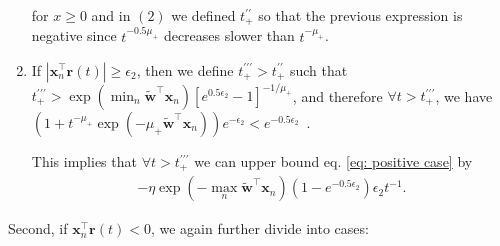 \documentclass[twoside,11pt,english]{article}
\begin{document}
\begin{enumerate}
for $x\geq0$ and in $\left(2\right)$ we defined $t_{+}^{\prime\prime}$
so that the previous expression is negative \textemdash{} since $t^{-0.5\mu_{+}}$ decreases slower than $t^{-\mu_{+}}$. 
\item If $\left|\mathbf{x}_{n}^{\top}\mathbf{r}(t)\right|\geq\epsilon_{2}$,
then we define $t_{+}^{\prime\prime\prime}>t_{+}^{\prime\prime}$
such that $t_{+}^{\prime\prime\prime}>\exp\left(\min_{n}\tilde{\mathbf{w}}^{\top}\mathbf{x}_{n}\right)\left[e^{0.5\epsilon_{2}}-1\right]^{-1/\mu_{+}}$,
and therefore $\forall t>t_{+}^{\prime\prime\prime}$, we have $\left(1+t^{-\mu_{+}}\exp\left(-\mu_{+}\tilde{\mathbf{w}}^{\top}\mathbf{x}_{n}\right)\right)e^{-\epsilon_{2}}<e^{-0.5\epsilon_{2}}$~.

This implies that $\forall t>t_{+}^{\prime\prime\prime}$ we can upper
bound eq. \ref{eq: positive case} by 
\begin{align}
-\eta\exp\left(-\max_{n}\tilde{\mathbf{w}}^{\top}\mathbf{x}_{n}\right)\left(1-e^{-0.5\epsilon_{2}}\right)\epsilon_{2}t^{-1}.\label{eq: positive case c}
\end{align}
\end{enumerate}
Second, if $\mathbf{x}_{n}^{\top}\mathbf{r}(t)<0$, we again further
divide into cases: 
\end{document}
